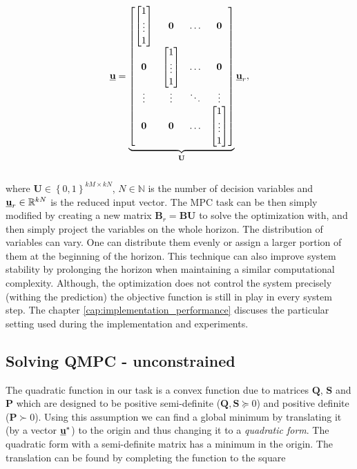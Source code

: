 \begin{equation}
\textbf{\underline{u}} = \underbrace{\begin{bmatrix}
\begin{bmatrix}
1\\
\vdots\\
1
\end{bmatrix} & \textbf{0} & \hdots & \textbf{0} \\
\textbf{0} & \begin{bmatrix}
1\\
\vdots\\
1
\end{bmatrix} & \hdots & \textbf{0}\\
\vdots & \vdots & \ddots & \vdots \\
\textbf{0} & \textbf{0} & \hdots & \begin{bmatrix}
1\\
\vdots\\
1
\end{bmatrix}
\end{bmatrix}}_{\textbf{U}}\textbf{\underline{u}}_{r},
\label{eq:moveblocking_example}
\end{equation}
\\
where $\textbf{U} \in \left\lbrace 0, 1 \right\rbrace ^{kM \times kN}$, $N \in \mathbb{N}$ is the number of decision variables and $\textbf{\underline{u}}_{r} \in \mathbb{R}^{kN}$ is the reduced input vector. The MPC task can be then simply modified by creating a new matrix $\textbf{\^B}_{r} = \textbf{\^B}\textbf{U}$ to solve the optimization with, and then simply project the variables on the whole horizon. The distribution of variables can vary. One can distribute them evenly or assign a larger portion of them at the beginning of the horizon. This technique can also improve system stability by prolonging the horizon when maintaining a similar computational complexity. Although, the optimization does not control the system precisely (withing the prediction) the objective function is still in play in every system step. The chapter \ref{cap:implementation_performance} discuses the particular setting used during the implementation and experiments.

\subsection{Solving QMPC - unconstrained}
\label{cap:qmpc_unconstrained}

The quadratic function in our task is a convex function due to matrices $\textbf{Q}$, $\textbf{S}$ and $\textbf{P}$ which are designed to be positive semi-definite ($\textbf{Q}, \textbf{S} \succeq 0$) and positive definite ($\textbf{P} \succ 0$). Using this assumption we can find a global minimum by translating it (by a vector $\textbf{\underline{u}}^*$) to the origin and thus changing it to a \textit{quadratic form}. The quadratic form with a semi-definite matrix has a minimum in the origin. The translation can be found by completing the function to the square

